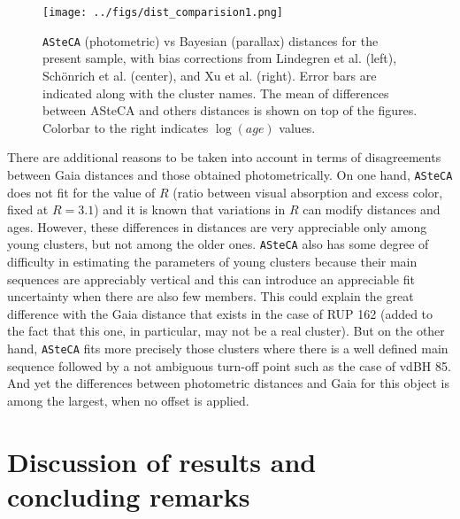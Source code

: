 \documentclass[draft]{aa}
\begin{document}
\begin{figure}[ht]
    \centering
    \texttt{[image: ../figs/dist\_comparision1.png]}
    \caption{\texttt{ASteCA} (photometric) vs Bayesian (parallax) distances for
    the present sample, with bias corrections from Lindegren et al. (left),
    Sch\"onrich et al. (center), and Xu et al. (right). Error bars are
    indicated along with the cluster names. The mean of differences between
    ASteCA and others distances is shown on top of the figures. Colorbar to
    the right indicates $\log(age)$ values.}
    \label{fig:prlxbias}
\end{figure}

There are additional reasons to be taken into account in terms of disagreements
between Gaia distances and those obtained photometrically. On one hand, 
\texttt{ASteCA} does not fit for the value of $R$ (ratio between visual
absorption and excess color, fixed at $R=3.1$) and it is known that variations
in $R$ can modify distances and ages. However, these differences in
distances are very appreciable only among young clusters, but not among the
older ones. 
\texttt{ASteCA} also has some degree of difficulty in estimating the parameters
of young clusters because their main sequences are appreciably vertical and
this can introduce an appreciable fit uncertainty when there are also few
members.
This could explain the great difference with the Gaia distance that exists in
the case of RUP 162 (added to the fact that this one, in particular, may not be
a real cluster). But on the other hand, \texttt{ASteCA} fits more precisely
those clusters where there is a well defined main sequence followed by a not
ambiguous turn-off point such as the case of vdBH 85. And yet the differences
between photometric distances and Gaia for this object is among the largest,
when no offset is applied.




\section{Discussion of results and concluding remarks}
\label{sec:results_concl}
\end{document}
